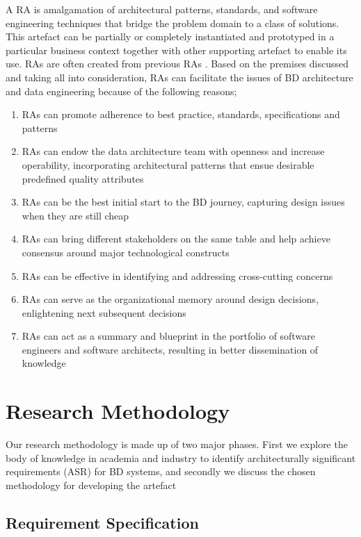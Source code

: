 \documentclass{bmcart}
\begin{document}
A RA is amalgamation of architectural patterns, standards, and software engineering techniques that bridge the problem domain to a class of solutions. This artefact can be partially or completely instantiated and prototyped in a particular business context together with other supporting artefact to enable its use. RAs are often created from previous RAs \cite{AtaeiACIS}. Based on the premises discussed and taking all into consideration, RAs can facilitate the issues of BD architecture and data engineering because of the following reasons;

\begin{enumerate}
    \item RAs can promote adherence to best practice, standards, specifications and patterns
    \item RAs can endow the data architecture team with openness and increase operability, incorporating architectural patterns that ensue desirable predefined quality attributes
    \item RAs can be the best initial start to the BD journey, capturing design issues when they are still cheap
    \item RAs can bring different stakeholders on the same table and help achieve consensus around major technological constructs
    \item RAs can be effective in identifying and addressing cross-cutting concerns
    \item RAs can serve as the organizational memory around design decisions, enlightening next subsequent decisions
    \item RAs can act as a summary and blueprint in the portfolio of software engineers and software architects, resulting in better dissemination of knowledge
\end{enumerate}

\section{Research Methodology} \label{RM-section}

Our research methodology is made up of two major phases. First we explore the body of knowledge in academia and industry to identify architecturally significant requirements (ASR) for BD systems, and secondly we discuss the chosen methodology for developing the artefact


\subsection{Requirement Specification} \label{requirement-spec-methodology}
\end{document}
